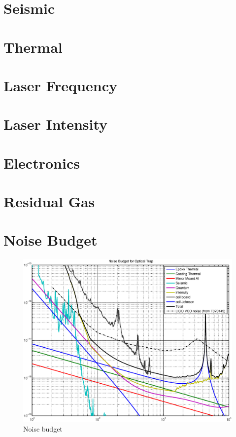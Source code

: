 \section{Seismic}

\section{Thermal}

\section{Laser Frequency}

\section{Laser Intensity}

\section{Electronics}

\section{Residual Gas}

\section{Noise Budget}

\begin{figure}[htbp]
	\centering
		\includegraphics[width=15cm]{./figures/noise_budget.eps}
	\caption[Noise Budget]{Noise budget}
	\label{fig:noise_bud}
\end{figure}

